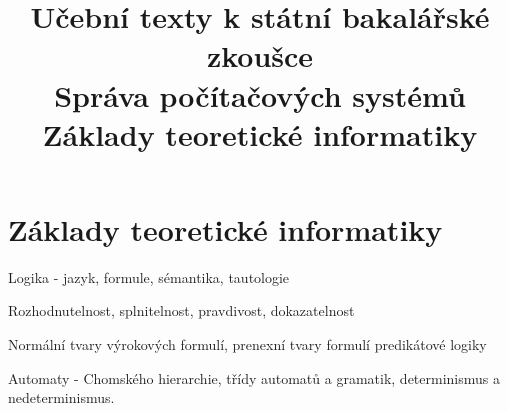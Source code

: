 \clearpage  \clearpage
\title{\LARGE Učební texty k státní bakalářské zkoušce \\ Správa počítačových systémů \\ Základy teoretické informatiky}

\maketitle
\newpage
\setcounter{section}{0}
\section{Základy teoretické informatiky}
\begin{pozadavky}
\begin{pitemize}
\item Logika - jazyk, formule, sémantika, tautologie
\item Rozhodnutelnost, splnitelnost, pravdivost, dokazatelnost
\item Normální tvary výrokových formulí, prenexní tvary formulí predikátové logiky
\item Automaty - Chomského hierarchie, třídy automatů a gramatik, determinismus a nedeterminismus.
\end{pitemize}
\end{pozadavky}






